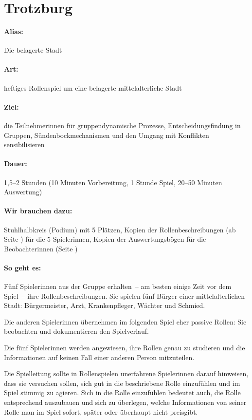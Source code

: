 \section{Trotzburg}
\paragraph{Alias:} Die belagerte Stadt
\paragraph{Art:} heftiges Rollenspiel um eine belagerte mittelalterliche Stadt
\paragraph{Ziel:} die Teilnehmerinnen für gruppendynamische Prozesse, Entscheidungsfindung in Gruppen, Sündenbockmechanismen und den Umgang mit Konflikten sensibilisieren
\paragraph{Dauer:} 1,5--2 Stunden (10 Minuten Vorbereitung, 1 Stunde Spiel, 20--50 Minuten Auswertung)
\paragraph{Wir brauchen dazu:} Stuhlhalbkreis (Podium) mit 5 Plätzen, Kopien der Rollenbeschreibungen (ab Seite \pageref{trotzburg-rollen}) für die 5 Spielerinnen, Kopien der Auswertungsbögen für die Beobachterinnen  (Seite \pageref{trotzburg-auswertung})
\paragraph{So geht es:}
Fünf Spielerinnen aus der Gruppe erhalten~-- am besten einige Zeit vor dem Spiel~-- ihre Rollenbeschreibungen. Sie spielen fünf Bürger einer mittelalterlichen Stadt: Bürgermeister, Arzt, Krankenpfleger, Wächter und Schmied.

Die anderen Spielerinnen übernehmen im folgenden Spiel eher passive Rollen: Sie beobachten und dokumentieren den Spielverlauf.

Die fünf Spielerinnen werden angewiesen, ihre Rollen genau zu studieren und die Informationen auf keinen Fall einer anderen Person mitzuteilen.

Die Spielleitung sollte in Rollenspielen unerfahrene Spielerinnen darauf hinweisen, dass sie versuchen sollen, sich gut in die beschriebene Rolle einzufühlen und im Spiel stimmig zu agieren. Sich in die Rolle einzufühlen bedeutet auch, die Rolle entsprechend auszubauen und sich zu überlegen, welche Informationen von seiner Rolle man im Spiel sofort, später oder überhaupt nicht preisgibt.

